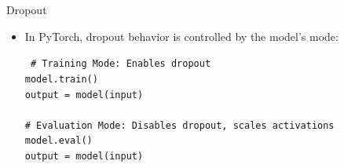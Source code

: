 \begin{frame}{Dropout}
    \begin{itemize}
        \item In PyTorch, dropout behavior is controlled by the model's mode:
            \begin{block}{}
        \texttt{\small
        \# Training Mode: Enables dropout\\
        model.train() \\
        output = model(input) \\
        \\
        \# Evaluation Mode: Disables dropout, scales activations\\
        model.eval() \\
        output = model(input)
        }
    \end{block}
    \end{itemize}
\end{frame} 
